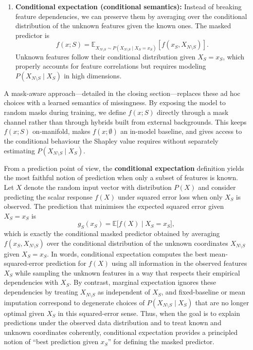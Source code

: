 \documentclass{article}
\begin{document}
\begin{enumerate}
    \item \textbf{Conditional expectation (conditional semantics):} Instead of breaking feature dependencies, we can preserve them by averaging over the conditional distribution of the unknown features given the known ones.
    The masked predictor is
    \[
    f(x; S) = \mathbb{E}_{X_{N \setminus S} \sim P(X_{N \setminus S} \mid X_S = x_S)}\!\left[f(x_S, X_{N \setminus S})\right].
    \]
    Unknown features follow their conditional distribution given $X_S = x_S$, which properly accounts for feature correlations but requires modeling $P(X_{N \setminus S} \mid X_S)$ in high dimensions.
\end{enumerate}

A mask-aware approach—detailed in the closing section—replaces these ad hoc choices with a learned semantics of missingness. By exposing the model to random masks during training, we define $f(x; S)$ directly through a mask channel rather than through hybrids built from external backgrounds. This keeps $f(x; S)$ on-manifold, makes $f(x; \emptyset)$ an in-model baseline, and gives access to the conditional behaviour the Shapley value requires without separately estimating $P(X_{N \setminus S} \mid X_S)$.

From a prediction point of view, the \textbf{conditional expectation} definition yields the most faithful notion of prediction when only a subset of features is known.
Let $X$ denote the random input vector with distribution $P(X)$ and consider predicting the scalar response $f(X)$ under squared error loss when only $X_S$ is observed.
The prediction that minimises the expected squared error given $X_S = x_S$ is
\[
g_S(x_S) = \mathbb{E}\bigl[f(X) \mid X_S = x_S\bigr],
\]
which is exactly the conditional masked predictor obtained by averaging $f(x_S, X_{N \setminus S})$ over the conditional distribution of the unknown coordinates $X_{N \setminus S}$ given $X_S = x_S$.
In words, conditional expectation computes the best mean-squared-error prediction for $f(X)$ using all information in the observed features $X_S$ while sampling the unknown features in a way that respects their empirical dependencies with $X_S$.
By contrast, marginal expectation ignores these dependencies by treating $X_{N \setminus S}$ as independent of $X_S$, and fixed-baseline or mean imputation correspond to degenerate choices of $P(X_{N \setminus S} \mid X_S)$ that are no longer optimal given $X_S$ in this squared-error sense.
Thus, when the goal is to explain predictions under the observed data distribution and to treat known and unknown coordinates coherently, conditional expectation provides a principled notion of ``best prediction given $x_S$'' for defining the masked predictor.
\end{document}

